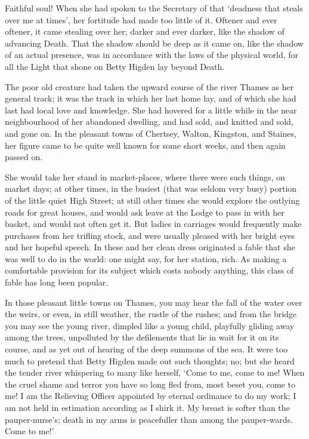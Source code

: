 Faithful soul! When she had spoken to the Secretary of that ‘deadness
that steals over me at times’, her fortitude had made too little of it.
Oftener and ever oftener, it came stealing over her; darker and ever
darker, like the shadow of advancing Death. That the shadow should
be deep as it came on, like the shadow of an actual presence, was in
accordance with the laws of the physical world, for all the Light that
shone on Betty Higden lay beyond Death.

The poor old creature had taken the upward course of the river Thames as
her general track; it was the track in which her last home lay, and of
which she had last had local love and knowledge. She had hovered for a
little while in the near neighbourhood of her abandoned dwelling, and
had sold, and knitted and sold, and gone on. In the pleasant towns of
Chertsey, Walton, Kingston, and Staines, her figure came to be quite
well known for some short weeks, and then again passed on.

She would take her stand in market-places, where there were such things,
on market days; at other times, in the busiest (that was seldom very
busy) portion of the little quiet High Street; at still other times she
would explore the outlying roads for great houses, and would ask leave
at the Lodge to pass in with her basket, and would not often get it. But
ladies in carriages would frequently make purchases from her trifling
stock, and were usually pleased with her bright eyes and her hopeful
speech. In these and her clean dress originated a fable that she was
well to do in the world: one might say, for her station, rich. As making
a comfortable provision for its subject which costs nobody anything,
this class of fable has long been popular.

In those pleasant little towns on Thames, you may hear the fall of
the water over the weirs, or even, in still weather, the rustle of the
rushes; and from the bridge you may see the young river, dimpled like a
young child, playfully gliding away among the trees, unpolluted by the
defilements that lie in wait for it on its course, and as yet out of
hearing of the deep summons of the sea. It were too much to pretend that
Betty Higden made out such thoughts; no; but she heard the tender river
whispering to many like herself, ‘Come to me, come to me! When the cruel
shame and terror you have so long fled from, most beset you, come to me!
I am the Relieving Officer appointed by eternal ordinance to do my work;
I am not held in estimation according as I shirk it. My breast is softer
than the pauper-nurse’s; death in my arms is peacefuller than among the
pauper-wards. Come to me!’

